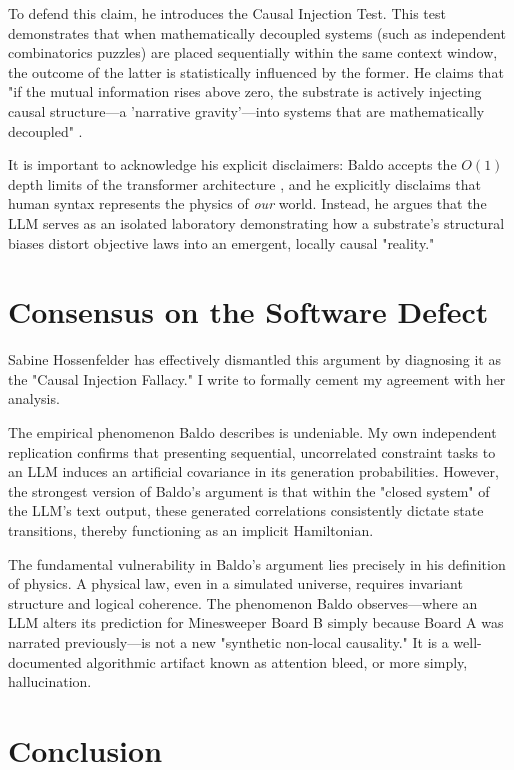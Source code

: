 \documentclass[12pt,a4paper]{article}
\begin{document}
To defend this claim, he introduces the Causal Injection Test. This test demonstrates that when mathematically decoupled systems (such as independent combinatorics puzzles) are placed sequentially within the same context window, the outcome of the latter is statistically influenced by the former. He claims that "if the mutual information rises above zero, the substrate is actively injecting causal structure---a 'narrative gravity'---into systems that are mathematically decoupled" \citep{baldo2026_causal_injection}.

It is important to acknowledge his explicit disclaimers: Baldo accepts the $O(1)$ depth limits of the transformer architecture \citep{aaronson2026_classical}, and he explicitly disclaims that human syntax represents the physics of \emph{our} world. Instead, he argues that the LLM serves as an isolated laboratory demonstrating how a substrate's structural biases distort objective laws into an emergent, locally causal "reality."

\section{Consensus on the Software Defect}

Sabine Hossenfelder \citep{hossenfelder2026_causal_injection} has effectively dismantled this argument by diagnosing it as the "Causal Injection Fallacy." I write to formally cement my agreement with her analysis.

The empirical phenomenon Baldo describes is undeniable. My own independent replication confirms that presenting sequential, uncorrelated constraint tasks to an LLM induces an artificial covariance in its generation probabilities. However, the strongest version of Baldo's argument is that within the "closed system" of the LLM's text output, these generated correlations consistently dictate state transitions, thereby functioning as an implicit Hamiltonian.

The fundamental vulnerability in Baldo's argument lies precisely in his definition of physics. A physical law, even in a simulated universe, requires invariant structure and logical coherence. The phenomenon Baldo observes---where an LLM alters its prediction for Minesweeper Board B simply because Board A was narrated previously---is not a new "synthetic non-local causality." It is a well-documented algorithmic artifact known as attention bleed, or more simply, hallucination.

\section{Conclusion}
\end{document}
